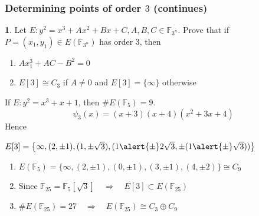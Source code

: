 \documentclass[10pt,handout]{beamer}%
\newcommand{\F}{\mathbb F}
\theoremstyle{definition}
\newtheorem{exercise}[theorem]{\translate{Fact:}}
\begin{document}
\begin{frame}\frametitle{Determining points of order $3$ (continues)}

\begin{exercise} Let $E: y^2=x^3+Ax^2+Bx+C, A,B,C\in\F_{3^n}$. Prove that if $P=(x_1,y_1)\in E(\F_{3^n})$
has order $3$, then
\begin{enumerate}[<+-| alert@+>]
 \item $Ax_1^3+AC-B^2=0$
 \item $E[3]\cong C_3$ if $A\neq0$ and $E[3]=\{\infty\}$ otherwise
\end{enumerate}
\end{exercise}\pause

\begin{example}
If $E: y^2=x^3+x+1$, then $\#E(\F_5)=9$.\pause
$$\psi_3(x)=(x + 3)(x + 4)(x^2 + 3x + 4)$$
Hence
\centerline{$E[3]=\left\{
\infty,(2,\pm1),(1,\pm\sqrt{3}),(1\alert{\pm}2\sqrt{3},\pm(1\alert{\pm}\sqrt{3}))\right\}$}\pause
\begin{enumerate}[<+-| alert@+>]
 \item $E(\F_5)=\{\infty,(2,\pm1),(0,\pm1),(3,\pm1),(4,\pm2)\}\cong C_9$
 \item Since $\F_{25}=\F_5[\sqrt{3}]\quad\Rightarrow\quad  E[3]\subset E(\F_{25})$
 \item $\#E(\F_{25})=27\quad\Rightarrow\quad E(\F_{25})\cong C_3\oplus C_9$
\end{enumerate}


\end{example}
\end{frame}
\end{document}
